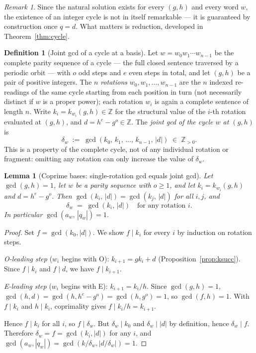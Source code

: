 \documentclass[12pt]{article}
\newtheorem{lemma}[theorem]{Lemma}
\theoremstyle{definition}
\newtheorem{definition}[theorem]{Definition}
\theoremstyle{remark}
\newtheorem{remark}[theorem]{Remark}
\newcommand{\ZZ}{\mathbb{Z}}
\newcommand{\kpoly}{k}
\begin{document}
\begin{remark}
Since the natural solution exists for every $(g,h)$ and every word $w$, the
existence of an integer cycle is not in itself remarkable — it is guaranteed
by construction once $q = d$.  What matters is reduction, developed in
Theorem~\ref{thm:cycle}.
\end{remark}

\begin{definition}[Joint gcd of a cycle at a basis]
\label{def:delta}
Let $w = w_0 w_1 \cdots w_{n-1}$ be the complete parity sequence of a
cycle — the full closed sentence traversed by a periodic orbit — with $o$
odd steps and $e$ even steps in total, and let $(g,h)$ be a pair of positive integers.
The $n$ \emph{rotations} $w_0, w_1, \ldots, w_{n-1}$ are the $n$ indexed
re-readings of the same cycle starting from each position in turn (not
necessarily distinct if $w$ is a proper power); each rotation $w_i$ is
again a complete sentence of length $n$.  Write
$k_i = \kpoly_{w_i}(g,h) \in \ZZ$ for the structural value of the $i$-th
rotation evaluated at $(g,h)$, and $d = h^e - g^o \in \ZZ$.  The
\emph{joint gcd of the cycle $w$ at $(g,h)$} is
\[
  \delta_w \;:=\; \gcd(k_0,\, k_1,\, \ldots,\, k_{n-1},\, |d|) \;\in\; \ZZ_{>0}.
\]
This is a property of the complete cycle, not of any individual rotation or
fragment: omitting any rotation can only increase the value of $\delta_w$.
\end{definition}

\begin{lemma}[Coprime bases: single-rotation gcd equals joint gcd]
\label{lem:natural-factor}
Let $\gcd(g,h) = 1$, let $w$ be a parity sequence with $o \geq 1$, and let
$k_i = \kpoly_{w_i}(g,h)$ and $d = h^e - g^o$.  Then
$\gcd(k_i,\,|d|) = \gcd(k_j,\,|d|)$ for all $i,j$, and
\[
  \delta_w \;=\; \gcd(k_i,\,|d|) \quad \text{for any rotation } i.
\]
In particular $\gcd(a_w,\,|q_w|) = 1$.
\end{lemma}

\begin{proof}
Set $f = \gcd(k_0,|d|)$.  We show $f \mid k_i$ for every $i$ by induction
on rotation steps.

\emph{O-leading step} ($w_i$ begins with O): $k_{i+1} = g k_i + d$
(Proposition~\ref{prop:ksucc}).  Since $f \mid k_i$ and $f \mid d$,
we have $f \mid k_{i+1}$.

\emph{E-leading step} ($w_i$ begins with E): $k_{i+1} = k_i/h$.
Since $\gcd(g,h)=1$, $\gcd(h,d) = \gcd(h,h^e-g^o) = \gcd(h,g^o) = 1$,
so $\gcd(f,h)=1$.  With $f \mid k_i$ and $h \mid k_i$, coprimality gives
$f \mid k_i/h = k_{i+1}$.

Hence $f \mid k_i$ for all $i$, so $f \mid \delta_w$.  But $\delta_w \mid k_0$
and $\delta_w \mid |d|$ by definition, hence $\delta_w \mid f$.  Therefore
$\delta_w = f = \gcd(k_i,|d|)$ for any $i$, and $\gcd(a_w,|q_w|) =
\gcd(k/\delta_w,|d/\delta_w|) = 1$.
\end{proof}
\end{document}
